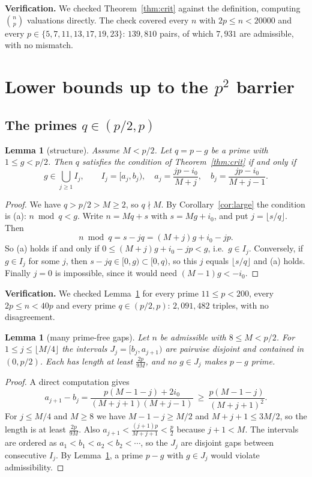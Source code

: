 \documentclass[11pt]{article}
\newtheorem{lemma}[theorem]{Lemma}
\theoremstyle{remark}
\begin{document}
\noindent\textbf{Verification.} We checked Theorem~\ref{thm:crit} against the definition, computing $\binom np$ valuations directly. The check covered every $n$ with $2p\le n<20000$ and every $p\in\{5,7,11,13,17,19,23\}$: $139{,}810$ pairs, of which $7{,}931$ are admissible, with no mismatch.

\section{Lower bounds up to the $p^2$ barrier}

\subsection{The primes $q\in(p/2,p)$}

\begin{lemma}[structure]\label{lem:struct}
Assume $M<p/2$. Let $q=p-g$ be a prime with $1\le g<p/2$. Then $q$ satisfies the condition of Theorem~\ref{thm:crit} if and only if
\[
g\in\bigcup_{j\ge1}I_j,\qquad I_j=[a_j,b_j),\quad a_j=\frac{jp-i_0}{M+j},\quad b_j=\frac{jp-i_0}{M+j-1}.
\]
\end{lemma}
\begin{proof}
We have $q>p/2>M\ge2$, so $q\nmid M$. By Corollary~\ref{cor:large} the condition is (a): $n\bmod q<g$. Write $n=Mq+s$ with $s=Mg+i_0$, and put $j=\lfloor s/q\rfloor$. Then
\[
n\bmod q=s-jq=(M+j)g+i_0-jp .
\]
So (a) holds if and only if $0\le (M+j)g+i_0-jp<g$, i.e.\ $g\in I_j$. Conversely, if $g\in I_j$ for some $j$, then $s-jq\in[0,g)\subset[0,q)$, so this $j$ equals $\lfloor s/q\rfloor$ and (a) holds. Finally $j=0$ is impossible, since it would need $(M-1)g<-i_0$.
\end{proof}

\noindent\textbf{Verification.} We checked Lemma~\ref{lem:struct} for every prime $11\le p<200$, every $2p\le n<40p$ and every prime $q\in(p/2,p)$: $2{,}091{,}482$ triples, with no disagreement.

\begin{lemma}[many prime-free gaps]\label{lem:gaps}
Let $n$ be admissible with $8\le M<p/2$. For $1\le j\le\lfloor M/4\rfloor$ the intervals $J_j=[b_j,a_{j+1})$ are pairwise disjoint and contained in $(0,p/2)$. Each has length at least $\frac{2p}{9M}$, and no $g\in J_j$ makes $p-g$ prime.
\end{lemma}
\begin{proof}
A direct computation gives
\[
a_{j+1}-b_j=\frac{p(M-1-j)+2i_0}{(M+j+1)(M+j-1)}\ \ge\ \frac{p(M-1-j)}{(M+j+1)^2}.
\]
For $j\le M/4$ and $M\ge 8$ we have $M-1-j\ge M/2$ and $M+j+1\le 3M/2$, so the length is at least $\frac{2p}{9M}$. Also $a_{j+1}<\frac{(j+1)p}{M+j+1}<\frac p2$ because $j+1<M$. The intervals are ordered as $a_1<b_1<a_2<b_2<\cdots$, so the $J_j$ are disjoint gaps between consecutive $I_j$. By Lemma~\ref{lem:struct}, a prime $p-g$ with $g\in J_j$ would violate admissibility.
\end{proof}
\end{document}
